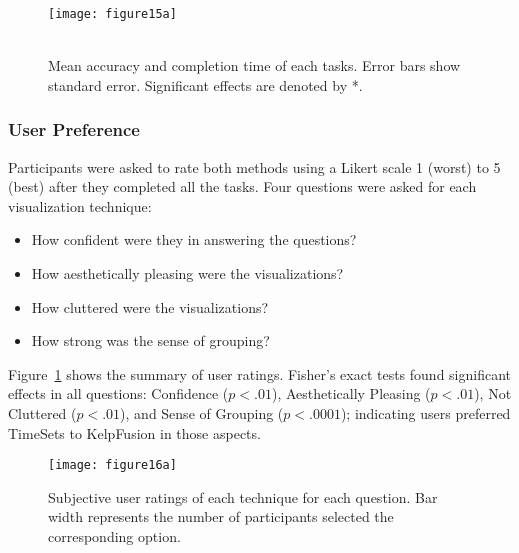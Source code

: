 \begin{figure}[ht]
	\centering
	 {\texttt{[image: figure15a]}} \\
	\\
	\caption{Mean accuracy and completion time of each tasks. Error bars show standard error. Significant effects are denoted by *.}
\end{figure}

\subsubsection{User Preference}
Participants were asked to rate both methods using a Likert scale 1 (worst) to 5 (best) after they completed all the tasks. Four questions were asked for each visualization technique: 
\begin{itemize}
	\item How confident were they in answering the questions? 
	\item How aesthetically pleasing were the visualizations? 
	\item How cluttered were the visualizations?
	\item How strong was the sense of grouping?
\end{itemize}
Figure~\ref{fig:ratings} shows the summary of user ratings. Fisher's exact tests found significant effects in all questions: Confidence ($p<.01$), Aesthetically Pleasing ($p<.01$), Not Cluttered ($p<.01$), and Sense of Grouping ($p<.0001$); indicating users preferred TimeSets to KelpFusion in those aspects.

\begin{figure}[ht]
	\centering
	 {\label{fig:pref-confidence}
		\texttt{[image: figure16a]}}
	\caption{Subjective user ratings of each technique for each question. Bar width represents the number of participants selected the corresponding option.}
	\label{fig:ratings}
\end{figure}


